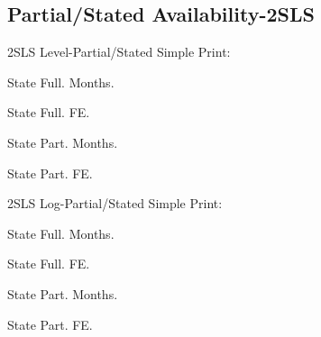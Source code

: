 \documentclass{beamer}
\begin{document}
\begin{frame}{}
\scalebox{0.5}{}
\end{frame}

\begin{frame}{}
\scalebox{0.5}{}
\end{frame}

\begin{frame}{}
\scalebox{0.5}{}
\end{frame}


\subsection{Partial/Stated Availability-2SLS}
\begin{frame}{2SLS Level-Partial/Stated}
Simple Print:

State Full. Months.

State Full. FE.

State Part. Months.

State Part. FE.
\end{frame}
\begin{frame}{}
\scalebox{0.6}{}
\end{frame}

\begin{frame}{}
\scalebox{0.6}{}
\end{frame}

\begin{frame}{}
\scalebox{0.6}{}
\end{frame}

\begin{frame}{}
\scalebox{0.6}{}
\end{frame}

\begin{frame}{2SLS Log-Partial/Stated}
Simple Print:

State Full. Months.

State Full. FE.

State Part. Months.

State Part. FE.
\end{frame}
\end{document}
